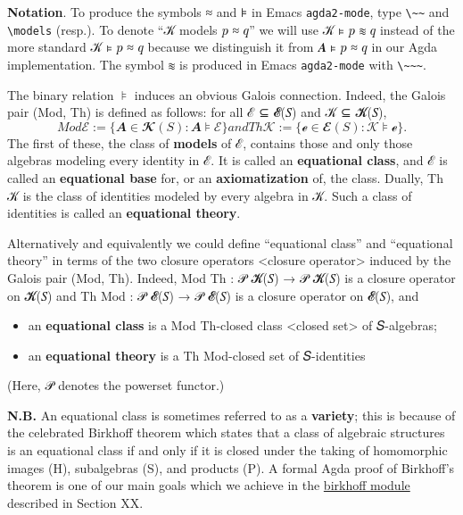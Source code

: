\documentclass[sigplan,screen]{acmart}
\begin{document}
\noindent \textbf{Notation}. To produce the symbols ≈ and ⊧ in Emacs \texttt{agda2-mode}, type \texttt{\textbackslash{}\textasciitilde{}\textasciitilde{}} and \texttt{\textbackslash{}models} (resp.). To denote ``𝒦 models 𝑝 ≈ 𝑞'' we will use 𝒦 ⊧ 𝑝 ≋ 𝑞 instead of the more standard 𝒦 ⊧ 𝑝 ≈ 𝑞 because we distinguish it from 𝑨 ⊧ 𝑝 ≈ 𝑞 in our Agda implementation. The symbol ≋ is produced in Emacs \texttt{agda2-mode} with \texttt{\textbackslash{}\textasciitilde{}\textasciitilde{}\textasciitilde{}}.

The binary relation \(⊧\) induces an obvious Galois connection. Indeed, the Galois pair (Mod, Th) is defined as follows: for all ℰ ⊆ 𝓔(𝑆) and 𝒦 ⊆ 𝓚(𝑆),
\[Mod ℰ := \{ 𝑨 ∈ 𝓚(𝑆) : 𝑨 ⊧ ℰ \} and Th 𝒦 := \{ℯ ∈ 𝓔(𝑆) : 𝒦 ⊧ ℯ \}.\]
The first of these, the class of \textbf{models} of ℰ, contains those and only those algebras modeling every identity in ℰ. It is called an \textbf{equational class}, and ℰ is called an \textbf{equational base} for, or an \textbf{axiomatization} of, the class. Dually, Th 𝒦 is the class of identities modeled by every algebra in 𝒦. Such a class of identities is called an \textbf{equational theory}.

Alternatively and equivalently we could define ``equational class'' and ``equational theory'' in terms of the two
closure operators \textless{}closure operator\textgreater{} induced by the Galois pair (Mod, Th). Indeed, Mod Th : 𝒫 𝓚(𝑆) → 𝒫 𝓚(𝑆) is a closure operator on 𝓚(𝑆) and Th Mod : 𝒫 𝓔(𝑆) → 𝒫 𝓔(𝑆) is a closure operator on 𝓔(𝑆), and

\begin{itemize}
\item an \textbf{equational class} is a Mod Th-closed class \textless{}closed set\textgreater{} of 𝑆-algebras;
\item an \textbf{equational theory} is a Th Mod-closed set of 𝑆-identities
\end{itemize}
(Here, 𝒫 denotes the powerset functor.)

\noindent \textbf{N.B.} An equational class is sometimes referred to as a \textbf{variety}; this is because of the celebrated Birkhoff theorem which states that a class of algebraic structures is an equational class if and only if it is closed under the taking of homomorphic images (H), subalgebras (S), and products (P). A formal Agda proof of Birkhoff's
theorem is one of our main goals which we achieve in the \href{https://gitlab.com/ualib/ualib.gitlab.io/-/blob/master/birkhoff.lagda.rst}{birkhoff module} described in Section XX.
\end{document}
